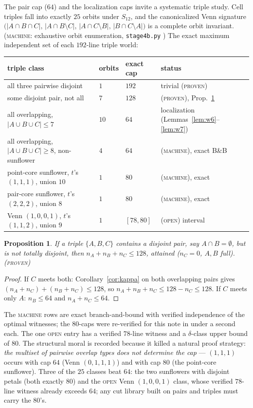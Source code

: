 \documentclass[11pt]{article}
\newtheorem{proposition}[theorem]{Proposition}
\theoremstyle{remark}
\begin{document}
The pair cap ($64$) and the localization caps invite a systematic triple
study. Cell triples fall into exactly $25$ orbits under $S_{12}$, and the
canonicalized Venn signature
$\bigl(|A\cap B\cap C|,\,|A\cap B\setminus C|,\,|A\cap C\setminus B|,\,
|B\cap C\setminus A|\bigr)$ is a complete orbit invariant.
\textsc{(machine}: exhaustive orbit enumeration, \texttt{stage4b.py}%
\textsc{)} The exact maximum independent set of each $192$-line triple
world:

\begin{center}
\small
\begin{tabular}{@{}llll@{}}
\toprule
triple class & orbits & exact cap & status \\
\midrule
all three pairwise disjoint & $1$ & $192$ & trivial \textsc{(proven)} \\
some disjoint pair, not all & $7$ & $128$ & \textsc{(proven)},
Prop.~\ref{prop:disjointpair} \\
all overlapping, $|A\cup B\cup C|\le7$ & $10$ & $64$ & localization
(Lemmas~\ref{lem:w6}--\ref{lem:w7}) \\
all overlapping, $|A\cup B\cup C|\ge8$, non-sunflower & $4$ & $64$ &
\textsc{(machine)}, exact B\&B \\
point-core sunflower, $t$'s $(1,1,1)$, union $10$ & $1$ & $80$ &
\textsc{(machine)}, exact \\
pair-core sunflower, $t$'s $(2,2,2)$, union $8$ & $1$ & $80$ &
\textsc{(machine)}, exact \\
Venn $(1,0,0,1)$, $t$'s $(1,1,2)$, union $9$ & $1$ & $[78,80]$ &
\textsc{(open)} interval \\
\bottomrule
\end{tabular}
\end{center}

\begin{proposition}\label{prop:disjointpair}
If a triple $\{A,B,C\}$ contains a disjoint pair, say $A\cap B=\emptyset$,
but is not totally disjoint, then $n_A+n_B+n_C\le 128$, attained
($n_C=0$, $A,B$ full). \textsc{(proven)}
\end{proposition}

\begin{proof}
If $C$ meets both: Corollary~\ref{cor:kappa} on both overlapping pairs
gives $(n_A+n_C)+(n_B+n_C)\le128$, so $n_A+n_B+n_C\le128-n_C\le128$. If
$C$ meets only $A$: $n_B\le64$ and $n_A+n_C\le64$.
\end{proof}

The \textsc{machine} rows are exact branch-and-bound with verified
independence of the optimal witnesses; the $80$-caps were re-verified for
this note in under a second each. The one \textsc{open} entry has a
verified $78$-line witness and a $\delta$-class upper bound of $80$. The
structural moral is recorded because it killed a natural proof strategy:
\emph{the multiset of pairwise overlap types does not determine the
cap} --- $(1,1,1)$ occurs with cap $64$ (Venn $(0,1,1,1)$) and with cap
$80$ (the point-core sunflower). Three of the $25$ classes beat $64$: the
two sunflowers with disjoint petals (both exactly $80$) and the
\textsc{open} Venn $(1,0,0,1)$ class, whose verified $78$-line witness
already exceeds $64$; any cut library built on
pairs and triples must carry the $80$'s.
\end{document}
